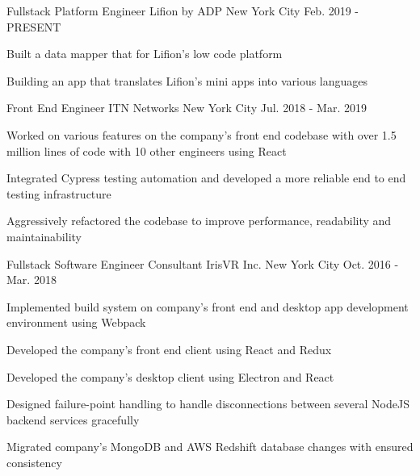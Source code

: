 

\begin{cventries}

  \cventry
    {Fullstack Platform Engineer} %
    {Lifion by ADP} %
    {New York City} %
    {Feb. 2019 - PRESENT} %
    {
      \begin{cvitems} %
        \item {Built a data mapper that for Lifion's low code platform}
        \item {Building an app that translates Lifion's mini apps into various languages}
      \end{cvitems}
    }

  \cventry
    {Front End Engineer} %
    {ITN Networks} %
    {New York City} %
    {Jul. 2018 - Mar. 2019} %
    {
      \begin{cvitems} %
        \item {Worked on various features on the company's front end codebase with over 1.5 million lines of code with 10 other engineers using React}
        \item {Integrated Cypress testing automation and developed a more reliable end to end testing infrastructure} 
        \item {Aggressively refactored the codebase to improve performance, readability and maintainability} 
      \end{cvitems}
    }

  \cventry
    {Fullstack Software Engineer Consultant} %
    {IrisVR Inc.} %
    {New York City} %
    {Oct. 2016 - Mar. 2018} %
    {
      \begin{cvitems} %
        \item {Implemented build system on company's front end and desktop app development environment using Webpack}
        \item {Developed the company's front end client using React and Redux}
        \item {Developed the company's desktop client using Electron and React}
        \item {Designed failure-point handling to handle disconnections between several NodeJS backend services gracefully}
        \item {Migrated company's MongoDB and AWS Redshift database changes with ensured consistency}
      \end{cvitems}
    }


\end{cventries}
